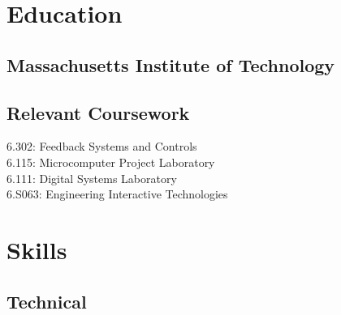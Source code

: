 \documentclass[letterpaper, article]{deedy-resume-openfont}
\begin{document}
\begin{minipage}[t]{0.33\textwidth}

\vspace{\topsep}


\section{Education}

\subsection{Massachusetts Institute of Technology \hfill}
\sectionsep

\subsection{Relevant Coursework \hfill}
\vspace{.05cm}
6.302: Feedback Systems and Controls\\
6.115: Microcomputer Project Laboratory \\
6.111: Digital Systems Laboratory \\
6.S063: Engineering Interactive Technologies




\section{Skills}
\subsection{Technical}


\end{minipage}
\end{document}

